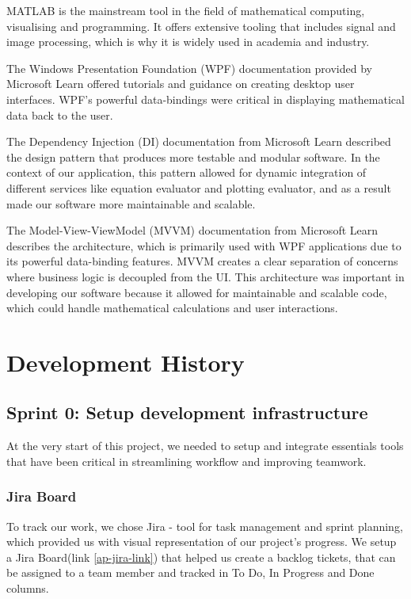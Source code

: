 \documentclass[a4paper, oneside, 11pt]{report}
\begin{document}
MATLAB\cite{Matlab:2023} is the mainstream tool in the field of mathematical computing, visualising and programming. It offers extensive tooling that includes signal and image processing, which is why it is widely used in academia and industry.

The Windows Presentation Foundation (WPF)\cite{WPF:2023} documentation provided by Microsoft Learn offered tutorials and guidance on creating desktop user interfaces. WPF’s powerful data-bindings were critical in displaying mathematical data back to the user.

The Dependency Injection (DI) \cite{DI:2023} documentation from Microsoft Learn described the design pattern that produces more testable and modular software. In the context of our application, this pattern allowed for dynamic integration of different services like equation evaluator and plotting evaluator, and as a result made our software more maintainable and scalable.

The Model-View-ViewModel (MVVM)\cite{MVVM:2022} documentation from Microsoft Learn describes the architecture, which is primarily used with WPF applications due to its powerful data-binding features. MVVM creates a clear separation of concerns where business logic is decoupled from the UI. This architecture was important in developing our software because it allowed for maintainable and scalable code, which could handle mathematical calculations and user interactions.


\chapter{Development History}\label{Chap:DevHist}

\section{Sprint 0: Setup development infrastructure}
At the very start of this project, we needed to setup and integrate essentials tools that have been critical in streamlining workflow and improving teamwork.

\subsection{Jira Board}
To track our work, we chose Jira\cite{Atlassian:JIRA} - tool for task management and sprint planning, which provided us with visual representation of our project's progress. We setup a Jira Board(link \ref{ap-jira-link}) that helped us create a backlog tickets, that can be assigned to a team member and tracked in To Do, In Progress and Done columns.
\end{document}
